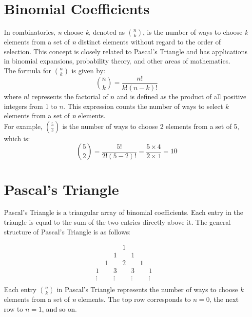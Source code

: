 \documentclass[12pt]{article}
\begin{document}
\section{Binomial Coefficients}
 
In combinatorics, \textit{n} choose \textit{k}, denoted as \( \binom{n}{k} \), is the number of ways to choose \textit{k} elements from a set of \textit{n} distinct elements without regard to the order of selection. This concept is closely related to Pascal's Triangle and has applications in binomial expansions, probability theory, and other areas of mathematics.\\

The formula for \( n \choose k \) is given by:
\[
\binom{n}{k} = \frac{n!}{k!(n-k)!}
\]
where \( n! \) represents the factorial of \( n \) and is defined as the product of all positive integers from 1 to \( n \). This expression counts the number of ways to select \textit{k} elements from a set of \textit{n} elements.\\

For example, \( \binom{5}{2} \) is the number of ways to choose 2 elements from a set of 5, which is:
\[
\binom{5}{2} = \frac{5!}{2!(5-2)!} = \frac{5 \times 4}{2 \times 1} = 10
\]

\section{Pascal's Triangle}
Pascal's Triangle is a triangular array of binomial coefficients. Each entry in the triangle is equal to the sum of the two entries directly above it. The general structure of Pascal's Triangle is as follows:

\[
\begin{array}{cccccccc}
    &  &  & 1 &  &  &  &  \\
    &  & 1 &  & 1 &  &  &  \\
    & 1 &  & 2 &  & 1 &  &  \\
    1 &  & 3 &  & 3 &  & 1 &  \\
    \vdots & & \vdots &  & \vdots & & \vdots  \\
\end{array}
\]
Each entry \( \binom{n}{k} \) in Pascal's Triangle represents the number of ways to choose \textit{k} elements from a set of \textit{n} elements. The top row corresponds to \( n = 0 \), the next row to \( n = 1 \), and so on.
\end{document}
